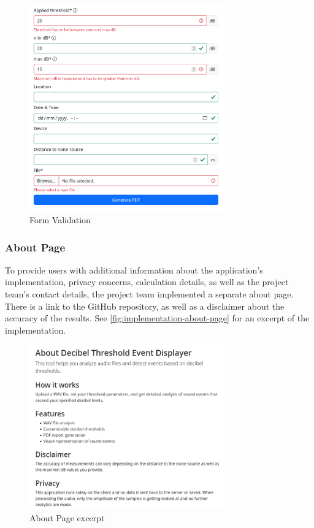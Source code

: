 \begin{figure}[H]
    \centering
    \includegraphics[width=0.75\textwidth]{../assets/implementation_validation.png}
    \caption{Form Validation}\label{fig:implementation-validation}
\end{figure}

\subsubsection{About Page}\label{subsubsec:about-page}
To provide users with additional information about the application's implementation, privacy concerns, calculation details, as well as the project team's contact details, the project team implemented
a separate about page. There is a link to the GitHub repository, as well as a disclaimer about the accuracy of the results. See \autoref{fig:implementation-about-page} for an excerpt of the implementation.
\begin{figure}[H]
    \centering
    \includegraphics[width=0.75\textwidth]{../assets/implementation_about_page.png}
    \caption{About Page excerpt}\label{fig:implementation-about-page}
\end{figure}

